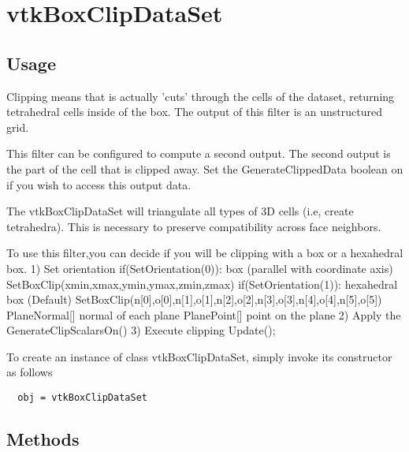 \section{vtkBoxClipDataSet}

\subsection{Usage}

 Clipping means that is actually 'cuts' through the cells of the dataset,
 returning tetrahedral cells inside of the box.
 The output of this filter is an unstructured grid.

 This filter can be configured to compute a second output. The
 second output is the part of the cell that is clipped away. Set the
 GenerateClippedData boolean on if you wish to access this output data.

 The vtkBoxClipDataSet will triangulate all types of 3D cells (i.e, create tetrahedra).
 This is necessary to preserve compatibility across face neighbors.

 To use this filter,you can decide if you will be clipping with a box or a hexahedral box.
 1) Set orientation 
    if(SetOrientation(0)): box (parallel with coordinate axis)
       SetBoxClip(xmin,xmax,ymin,ymax,zmin,zmax)  
    if(SetOrientation(1)): hexahedral box (Default)
       SetBoxClip(n[0],o[0],n[1],o[1],n[2],o[2],n[3],o[3],n[4],o[4],n[5],o[5])  
       PlaneNormal[] normal of each plane
       PlanePoint[] point on the plane 
 2) Apply the GenerateClipScalarsOn() 
 3) Execute clipping  Update();

To create an instance of class vtkBoxClipDataSet, simply
invoke its constructor as follows
\begin{verbatim}
  obj = vtkBoxClipDataSet
\end{verbatim}
\subsection{Methods}

